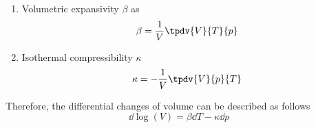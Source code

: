 \documentclass[../qm.tex]{subfiles}
\begin{document}
\begin{enumerate}
\item Volumetric expansivity $\beta$ as
	\begin{equation}
		\beta=\frac{1}{V}\tpdv{V}{T}{p}
		\label{eq:volumeexp.temp}
	\end{equation}
\item Isothermal compressibility $\kappa$
	\begin{equation}
		\kappa=-\frac{1}{V}\tpdv{V}{p}{T}
		\label{eq:isothcomp.temp}
	\end{equation}
\end{enumerate}
Therefore, the differential changes of volume can be described as follows
\begin{equation}
	\dd\log\left( V \right)=\beta\dd T-\kappa\dd p
	\label{eq:volchange.temp}
\end{equation}
\end{document}
